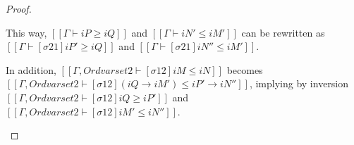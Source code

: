 \begin{proof}
\begin{caseof}
    This way, $[[Γ ⊢ iP ≥ iQ]]$ and $[[Γ ⊢ iN' ≤ iM']]$ can be rewritten as
    $[[Γ ⊢ [σ21]iP' ≥ iQ]]$ and $[[Γ ⊢ [σ21] iN'' ≤ iM']]$.

    In addition, $[[Γ, Ord varset2 ⊢ [σ12]iM ≤ iN]]$ becomes
    $[[Γ, Ord varset2 ⊢ [σ12](iQ → iM') ≤ iP' → iN'']]$,
    implying by inversion
    $[[Γ, Ord varset2 ⊢ [σ12]iQ ≥ iP']]$ and
    $[[Γ, Ord varset2 ⊢ [σ12]iM' ≤ iN'']]$.

  \end{caseof}
\end{proof}